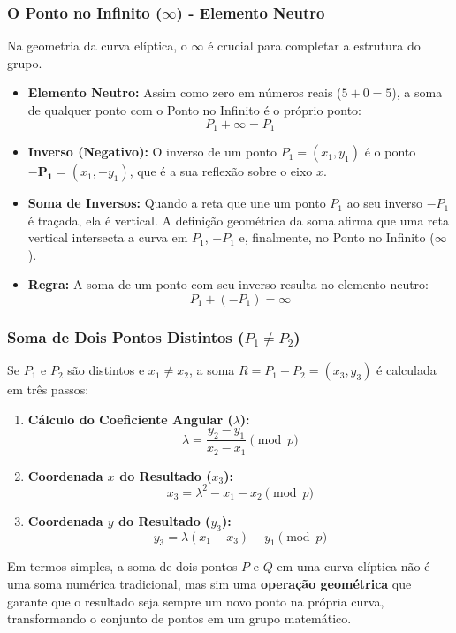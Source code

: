 \documentclass{article}
\theoremstyle{definicao_estilo}
\begin{document}
\subsubsection{O Ponto no Infinito ($\infty$) - Elemento Neutro}

Na geometria da curva elíptica, o $\mathbf{\infty}$ é crucial para completar a estrutura do grupo.

\begin{itemize}
\item \textbf{Elemento Neutro:} Assim como zero em números reais ($5+0=5$), a soma de qualquer ponto com o Ponto no Infinito é o próprio ponto:
$$ P_1 + \infty = P_1 $$
\item \textbf{Inverso (Negativo):} O inverso de um ponto $P_1 = (x_1, y_1)$ é o ponto $\mathbf{-P_1} = (x_1, -y_1)$, que é a sua reflexão sobre o eixo $x$.
\item \textbf{Soma de Inversos:} Quando a reta que une um ponto $P_1$ ao seu inverso $-P_1$ é traçada, ela é vertical. A definição geométrica da soma afirma que uma reta vertical intersecta a curva em $P_1$, $-P_1$ e, finalmente, no Ponto no Infinito ($\infty$).
\item \textbf{Regra:} A soma de um ponto com seu inverso resulta no elemento neutro:
$$ P_1 + (-P_1) = \infty $$
\end{itemize}

\subsubsection*{Soma de Dois Pontos Distintos ($P_1 \neq P_2$)}
Se $P_1$ e $P_2$ são distintos e $x_1 \neq x_2$, a soma $R = P_1 + P_2 = (x_3, y_3)$ é calculada em três passos:

\begin{enumerate}
\item \textbf{Cálculo do Coeficiente Angular ($\lambda$):}
$$ \lambda = \frac{y_2 - y_1}{x_2 - x_1} \pmod p $$
\item \textbf{Coordenada $x$ do Resultado ($x_3$):}
$$ x_3 = \lambda^2 - x_1 - x_2 \pmod p $$
\item \textbf{Coordenada $y$ do Resultado ($y_3$):}
$$ y_3 = \lambda(x_1 - x_3) - y_1 \pmod p $$
\end{enumerate}

Em termos simples, a soma de dois pontos $P$ e $Q$ em uma curva elíptica não é uma soma numérica tradicional, mas sim uma \textbf{operação geométrica} que garante que o resultado seja sempre um novo ponto na própria curva, transformando o conjunto de pontos em um grupo matemático.
\end{document}
